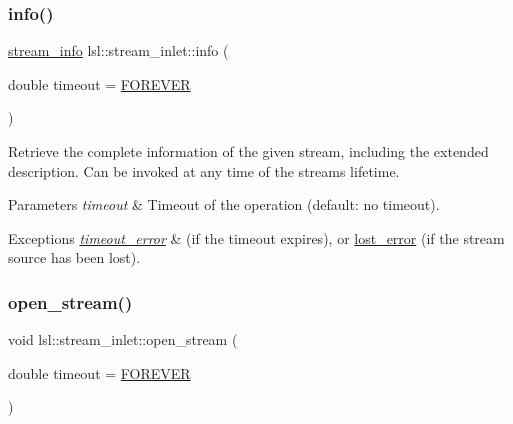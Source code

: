 \mbox{\label{classlsl_1_1stream__inlet_ae895a8d5c10dc4072e969686fc402b5b}} 
\subsubsection{\texorpdfstring{info()}{info()}}
{\footnotesize\ttfamily \hyperlink{classlsl_1_1stream__info}{stream\+\_\+info} lsl\+::stream\+\_\+inlet\+::info (\begin{DoxyParamCaption}\item[{double}]{timeout = {\ttfamily \hyperlink{namespacelsl_a74cfbc9077aca21295117217249721ed}{F\+O\+R\+E\+V\+ER}} }\end{DoxyParamCaption})\hspace{0.3cm}{\ttfamily [inline]}}

Retrieve the complete information of the given stream, including the extended description. Can be invoked at any time of the stream\textquotesingle{}s lifetime. 
\begin{DoxyParams}{Parameters}
{\em timeout} & Timeout of the operation (default\+: no timeout). \\
\hline
\end{DoxyParams}

\begin{DoxyExceptions}{Exceptions}
{\em \hyperlink{classlsl_1_1timeout__error}{timeout\+\_\+error}} & (if the timeout expires), or \hyperlink{classlsl_1_1lost__error}{lost\+\_\+error} (if the stream source has been lost). \\
\hline
\end{DoxyExceptions}
\mbox{\label{classlsl_1_1stream__inlet_ad84029ed0662d755b0544c7652348718}} 
\subsubsection{\texorpdfstring{open\+\_\+stream()}{open\_stream()}}
{\footnotesize\ttfamily void lsl\+::stream\+\_\+inlet\+::open\+\_\+stream (\begin{DoxyParamCaption}\item[{double}]{timeout = {\ttfamily \hyperlink{namespacelsl_a74cfbc9077aca21295117217249721ed}{F\+O\+R\+E\+V\+ER}} }\end{DoxyParamCaption})\hspace{0.3cm}{\ttfamily [inline]}}

